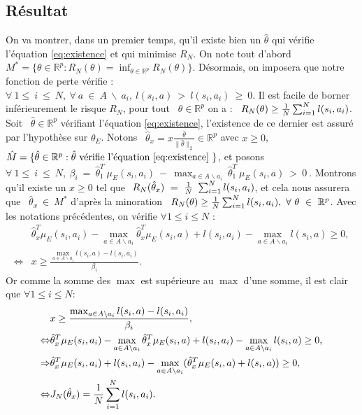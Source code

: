 \documentclass[publibook-draft]{CAp2012}
\begin{document}
\subsection{Résultat}
On va montrer, dans un premier temps, qu'il existe bien un $\hat{\theta}$ qui vérifie l'équation \eqref{eq:existence} et qui minimise $R_N$.
On note tout d'abord ~$M^*=\{\theta\in\mathbb{R}^p:R_N(\theta)=\inf_{\theta \in \mathbb{R}^p}R_N(\theta)\}$. Désormais, on imposera que notre fonction de perte vérifie : ~$\forall~1\leq~i~\leq~N,~\forall~a~\in~A~\backslash~a_i,~l(s_i,a)~>~l(s_i,a_i)~\geq~0$. Il est facile de borner inférieurement le risque $R_N$, pour tout ~$\theta\in\mathbb{R}^p$ on a : ~$R_N(\theta)\geq {1\over N} \sum_{i=1}^N l(s_i,a_i)$. Soit ~$\hat{\theta}\in\mathbb{R}^p$ vérifiant l'équation \eqref{eq:existence}, l'existence de ce dernier est assuré par l'hypothèse sur $\theta_E$. Notons ~$\hat{\theta}_x=x\frac{\hat{\theta}}{\|\hat{\theta}\|_2}\in\mathbb{R}^p$ avec $x\geq0$,~$\hat{M}=\{\hat{\theta}\in\mathbb{R}^p:\hat{\theta} \text{ vérifie l'équation \eqref{eq:existence} }\}$, et posons ~$\forall~1\leq~i~\leq~N,~\beta_i~=~\hat{\theta}_1^T~\mu_E(s_i,a_i)~-~\max_{a\in A \backslash a_i}~\hat{\theta}_1^T~\mu_E(s_i,a)~>~0~$.
Montrons qu'il existe un $x\geq0$ tel que $~R_N(\hat{\theta}_x)~=~{1\over N}~\sum_{i=1}^N l(s_i,a_i)$, et cela nous assurera que ~$\hat{\theta}_x~\in~M^*$ d'après la minoration ~$R_N(\theta)\geq {1\over N} \sum_{i=1}^N l(s_i,a_i),~\forall~\theta~\in~\mathbb{R}^p$. Avec les notations précédentes, on vérifie $\forall 1\leq i \leq N$ :
\begin{align}
&\hat{\theta}_x^T\mu_E(s_i,a_i)-\max_{a\in A \backslash a_i}\hat{\theta}_x^T\mu_E(s_i,a) + l(s_i,a_i)-\max_{a\in A \backslash a_i}l(s_i,a)\geq0,\\
\Leftrightarrow&x\geq\frac{\max_{a\in A \backslash a_i}l(s_i,a)-l(s_i,a_i)}{\beta_i}.
\end{align}
Or comme la somme des $\max$ est supérieure au $\max$ d'une somme, il est clair que $\forall 1\leq i \leq N$:
\begin{align}
&x\geq\frac{\max_{a\in A \backslash a_i}l(s_i,a)-l(s_i,a_i)}{\beta_i},\\
\Leftrightarrow&\hat{\theta}_x^T\mu_E(s_i,a_i)-\max_{a \in A \backslash a_i}\hat{\theta}_x^T\mu_E(s_i,a) + l(s_i,a_i)-\max_{a\in A \backslash a_i}l(s_i,a)\geq0,\\
\Rightarrow&\hat{\theta}_x^T\mu_E(s_i,a_i) + l(s_i,a_i)-\max_{a \in A  \backslash a_i}(\hat{\theta}_x^T\mu_E(s_i,a)+l(s_i,a))\geq0,\\
\Leftrightarrow&J_N(\hat{\theta}_x)={1\over N} \sum_{i=1}^N l(s_i,a_i).
\end{align}
\end{document}

